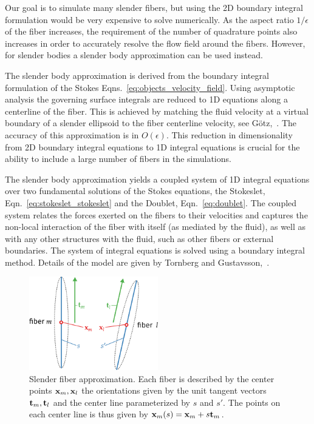 Our goal is to simulate many slender fibers, but using the 2D boundary integral formulation would be very expensive to solve numerically. As the aspect ratio $1/\epsilon$ of the fiber increases, the requirement of the number of quadrature points also increases in order to accurately resolve the flow field around the fibers. However, for slender bodies a slender body approximation can be used instead. 

The slender body approximation is derived from the boundary integral formulation of the Stokes Eqns.~\eqref{eq:objects_velocity_field}. Using asymptotic analysis the governing surface integrals are reduced to 1D equations along a centerline of the fiber. This is achieved by matching the fluid velocity at a virtual boundary of a slender ellipsoid to the fiber centerline velocity, see Götz,~\cite{Gotz2000}. The accuracy of this approximation is in $O(\epsilon).$ This reduction in dimensionality from 2D boundary integral equations to 1D integral equations is crucial for the ability to include a large number of fibers in the simulations.

The slender body approximation yields a coupled system of 1D integral equations over two fundamental solutions of the Stokes equations, the Stokeslet, Eqn.~\eqref{eq:stokeslet_stokeslet} and the Doublet, Eqn.~\eqref{eq:doublet}. The coupled system relates the forces exerted on the fibers to their velocities and captures the non-local interaction of the fiber with itself (as mediated by the fluid), as well as with any other structures with the fluid, such as other fibers or external boundaries. The system of integral equations is solved using a boundary integral method. Details of the model are given by Tornberg and Gustavsson,~\cite{Tornberg2006}.

\begin{figure}[!htbp]
  \centering
  \includegraphics[width=0.5\textwidth]{img/slender.pdf}
  \caption[Slender fiber approximation.]{Slender fiber approximation. Each fiber is described by the center points $\mathbf{x}_m, \mathbf{x}_l$ the orientations given by the unit tangent vectors $\mathbf{t}_m, \mathbf{t}_l$ and the center line parameterized by $s$ and $s'$. The points on each center line is thus given by $\mathbf{x}_m(s) = \mathbf{x}_m + s\mathbf{t}_m$.}
  \label{fig:slender_fiber}
\end{figure}

